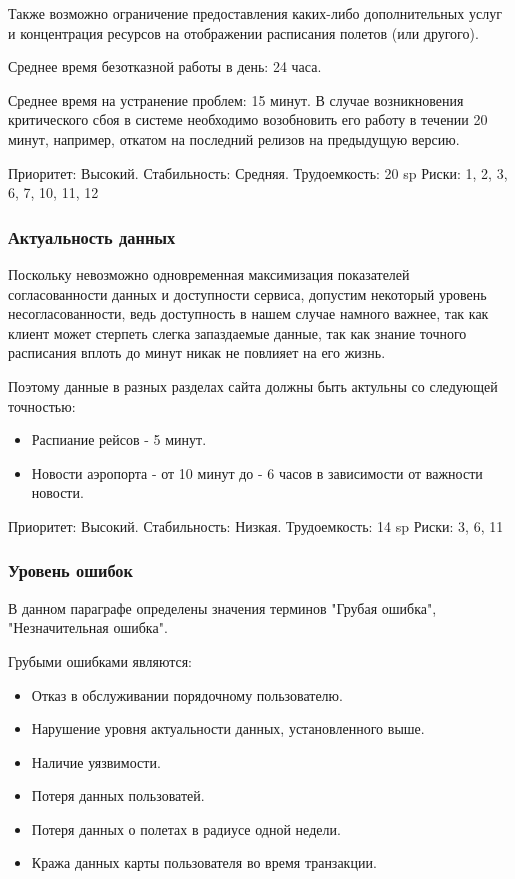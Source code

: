 Также возможно ограничение предоставления каких-либо
дополнительных услуг и концентрация ресурсов на
отображении расписания полетов (или другого).

Среднее время безотказной работы в день: 24 часа.

Среднее время на устранение проблем: 15 минут.
В случае возникновения критического сбоя в системе
необходимо возобновить его работу в течении 20 минут,
например, откатом на последний релизов на
предыдущую версию.

Приоритет: Высокий. Стабильность: Средняя. Трудоемкость: 20 sp
Риски: 1, 2, 3, 6, 7, 10, 11, 12

\subsubsection{Актуальность данных}

Поскольку невозможно одновременная максимизация
показателей согласованности данных и доступности
сервиса, допустим некоторый уровень несогласованности,
ведь доступность в нашем случае намного важнее,
так как клиент может стерпеть слегка запаздаемые
данные, так как знание точного расписания вплоть до
минут никак не повлияет на его жизнь.

Поэтому данные в разных разделах сайта должны
быть актульны со следующей точностью:
\begin{itemize}
      \item Распиание рейсов - 5 минут.
      \item Новости аэропорта - от 10 минут
            до - 6 часов в зависимости от
            важности новости.
\end{itemize}

Приоритет: Высокий. Стабильность: Низкая. Трудоемкость: 14 sp
Риски: 3, 6, 11

\subsubsection{Уровень ошибок}

В данном параграфе определены значения терминов
"Грубая ошибка", "Незначительная ошибка".

Грубыми ошибками являются:
\begin{itemize}
      \item Отказ в обслуживании
            порядочному пользователю.
      \item Нарушение уровня актуальности данных,
            установленного выше.
      \item Наличие уязвимости.
      \item Потеря данных пользоватей.
      \item Потеря данных о полетах
            в радиусе одной недели.
      \item Кража данных карты пользователя во время
            транзакции.
\end{itemize}

